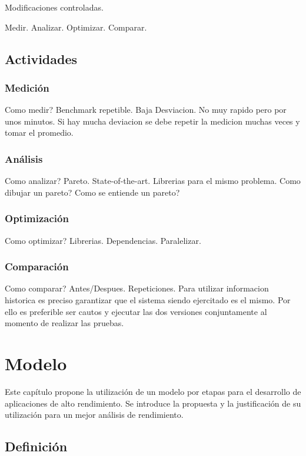\documentclass[a4paper]{report}
\begin{document}
Modificaciones controladas.

\bigskip

Medir. Analizar. Optimizar. Comparar.

\section{Actividades}

\subsection{Medici\'on}

Como medir? Benchmark repetible. Baja Desviacion. No muy rapido pero por unos
minutos. Si hay mucha deviacion se debe repetir la medicion muchas veces y
tomar el promedio.

\subsection{An\'alisis}

Como analizar? Pareto. State-of-the-art. Librerias para el mismo problema.
Como dibujar un pareto? Como se entiende un pareto?

\subsection{Optimizaci\'on}

Como optimizar? Librerias. Dependencias. Paralelizar.

\subsection{Comparaci\'on}

Como comparar? Antes/Despues. Repeticiones. Para utilizar informacion
historica es preciso garantizar que el sistema siendo ejercitado es el mismo. Por ello es preferible ser cautos y ejecutar las dos versiones conjuntamente
al momento de realizar las pruebas.

\chapter{Modelo}

Este cap\'itulo propone la utilizaci\'on de un modelo por etapas para el desarrollo de aplicaciones de alto rendimiento.
Se introduce la propuesta y la justificaci\'on de su utilizaci\'on para un mejor an\'alisis de rendimiento.

\section{Definici\'on}
\end{document}
